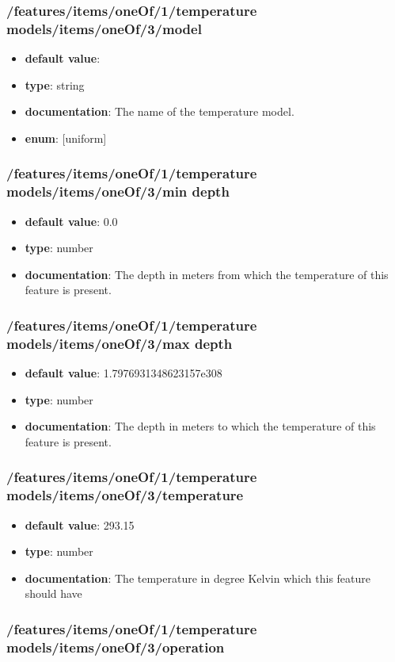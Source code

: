\subsubsection{/features/items/oneOf/1/temperature models/items/oneOf/3/model}
\begin{itemize}\item {\bf default value}: 
\item {\bf type}: string
\item {\bf documentation}: The name of the temperature model.
\item {\bf enum}: [uniform]\end{itemize}\subsubsection{/features/items/oneOf/1/temperature models/items/oneOf/3/min depth}
\begin{itemize}\item {\bf default value}: 0.0
\item {\bf type}: number
\item {\bf documentation}: The depth in meters from which the temperature of this feature is present.
\end{itemize}\subsubsection{/features/items/oneOf/1/temperature models/items/oneOf/3/max depth}
\begin{itemize}\item {\bf default value}: 1.7976931348623157e308
\item {\bf type}: number
\item {\bf documentation}: The depth in meters to which the temperature of this feature is present.
\end{itemize}\subsubsection{/features/items/oneOf/1/temperature models/items/oneOf/3/temperature}
\begin{itemize}\item {\bf default value}: 293.15
\item {\bf type}: number
\item {\bf documentation}: The temperature in degree Kelvin which this feature should have
\end{itemize}\subsubsection{/features/items/oneOf/1/temperature models/items/oneOf/3/operation}
